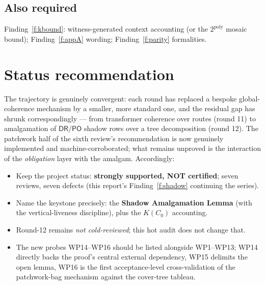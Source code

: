 \documentclass[11pt]{article}
\theoremstyle{definition}
\newcommand{\PO}{\mathsf{PO}}
\newcommand{\DR}{\mathsf{DR}}
\begin{document}
\subsection*{Also required}
Finding~\ref{f:kbound}: witness-generated context accounting (or the
$2^{\mathrm{poly}}$ mosaic bound); Finding~\ref{f:appA} wording;
Finding~\ref{f:parity} formalities.

\section{Status recommendation}

The trajectory is genuinely convergent: each round has replaced a bespoke
global-coherence mechanism by a smaller, more standard one, and the
residual gap has shrunk correspondingly --- from transformer coherence over
routes (round 11) to amalgamation of $\DR/\PO$ shadow rows over a tree
decomposition (round 12).  The patchwork half of the sixth review's
recommendation is now genuinely implemented and machine-corroborated; what
remains unproved is the interaction of the \emph{obligation} layer with the
amalgam.  Accordingly:

\begin{itemize}[leftmargin=2em]
\item Keep the project status: \textbf{strongly supported, NOT certified};
seven reviews, seven defects (this report's Finding~\ref{f:shadow}
continuing the series).
\item Name the keystone precisely: the \textbf{Shadow Amalgamation Lemma}
(with the vertical-liveness discipline), plus the $K(C_0)$ accounting.
\item Round-12 remains \emph{not cold-reviewed}; this hot audit does not
change that.
\item The new probes WP14--WP16 should be listed alongside WP1--WP13; WP14
directly backs the proof's central external dependency, WP15 delimits the
open lemma, WP16 is the first acceptance-level cross-validation of the
patchwork-bag mechanism against the cover-tree tableau.
\end{itemize}
\end{document}

